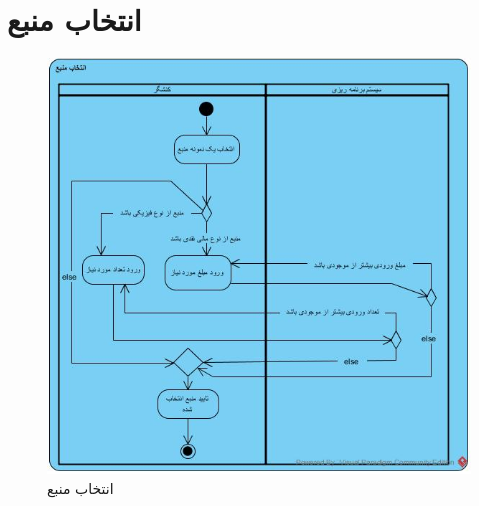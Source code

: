 \section{انتخاب منبع}
\begin{figure}[H]
	\centering
	\includegraphics[scale=0.8]{img/activity/ResourceSelection}
	\caption{انتخاب منبع}
\end{figure}


